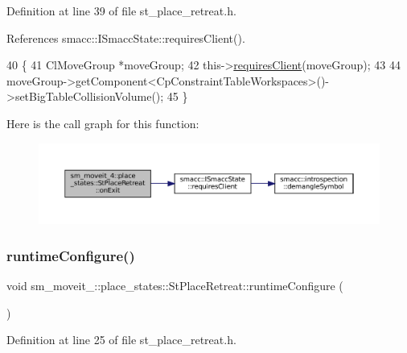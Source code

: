 Definition at line 39 of file st\+\_\+place\+\_\+retreat.\+h.



References smacc\+::\+I\+Smacc\+State\+::requires\+Client().


\begin{DoxyCode}
40     \{
41         ClMoveGroup *moveGroup;
42         this->\hyperlink{classsmacc_1_1ISmaccState_a7f95c9f0a6ea2d6f18d1aec0519de4ac}{requiresClient}(moveGroup);
43 
44         moveGroup->getComponent<CpConstraintTableWorkspaces>()->setBigTableCollisionVolume();
45     \}
\end{DoxyCode}
Here is the call graph for this function\+:
\nopagebreak
\begin{figure}[H]
\begin{center}
\leavevmode
\includegraphics[width=350pt]{structsm__moveit__4_1_1place__states_1_1StPlaceRetreat_a700f6a70e4c9836fef4b4b3e9546500d_cgraph}
\end{center}
\end{figure}
\mbox{\label{structsm__moveit__4_1_1place__states_1_1StPlaceRetreat_a592a95bb086fd10381dee175af55e71e}} 
\subsubsection{\texorpdfstring{runtime\+Configure()}{runtimeConfigure()}}
{\footnotesize\ttfamily void sm\+\_\+moveit\+\_\+::place\+\_\+states\+::\+St\+Place\+Retreat\+::runtime\+Configure (\begin{DoxyParamCaption}{ }\end{DoxyParamCaption})\hspace{0.3cm}{\ttfamily [inline]}}



Definition at line 25 of file st\+\_\+place\+\_\+retreat.\+h.



